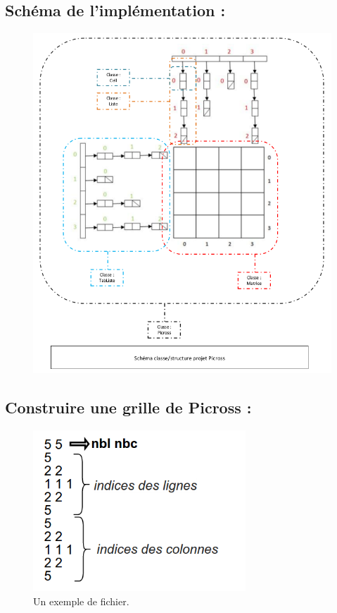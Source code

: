 \documentclass{article}
\begin{document}
\subsection{Schéma de l'implémentation :}
\begin{landscape}
\begin{figure}
\begin{center}
\includegraphics[width=15cm]{./images/recapitulatif_stucture.png}
\end{center}
\end{figure}
\end{landscape}
\newpage
\subsection{Construire une grille de Picross :}
\begin{figure}[h]
\begin{center}
\includegraphics[width=8cm]{ex2}
\end{center}
\caption{Un exemple de fichier.}
\end{figure}
\end{document}
